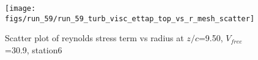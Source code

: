 \begin{figure}[H]
\centering
\texttt{[image: figs/run\_59/run\_59\_turb\_visc\_ettap\_top\_vs\_r\_mesh\_scatter]}
\caption{Scatter plot of reynolds stress term vs radius at $z/c$=9.50, $V_{free}$=30.9, station6}
\label{fig:run_59_turb_visc_ettap_top_vs_r_mesh_scatter}
\end{figure}


